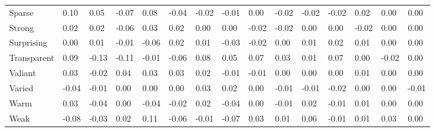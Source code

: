 \documentclass[
]{article}
\newenvironment{lltable}{\begin{landscape}\begin{center}\begin{ThreePartTable}}{\end{ThreePartTable}\end{center}\end{landscape}}
\begin{document}
\begin{lltable}
{\begin{longtable}{lllllllllllllll}
Sparse & 0.10 & 0.05 & -0.07 & 0.08 & -0.04 & -0.02 & -0.01 & 0.00 & -0.02 & -0.02 & -0.02 & 0.02 & 0.00 & 0.00\\
Strong & 0.02 & 0.02 & -0.06 & 0.03 & 0.02 & 0.00 & 0.00 & -0.02 & -0.02 & 0.00 & 0.00 & -0.02 & 0.00 & 0.00\\
Surprising & 0.00 & 0.01 & -0.01 & -0.06 & 0.02 & 0.01 & -0.03 & -0.02 & 0.00 & 0.01 & 0.02 & 0.01 & 0.00 & 0.00\\
Transparent & 0.09 & -0.13 & -0.11 & -0.01 & -0.06 & 0.08 & 0.05 & 0.07 & 0.03 & 0.01 & 0.07 & 0.00 & -0.02 & 0.00\\
Valiant & 0.03 & -0.02 & 0.04 & 0.03 & 0.03 & 0.02 & -0.01 & -0.01 & 0.00 & 0.00 & 0.00 & 0.01 & 0.00 & 0.00\\
Varied & -0.04 & -0.01 & 0.00 & 0.00 & 0.00 & 0.03 & 0.02 & 0.00 & -0.01 & -0.01 & -0.02 & 0.00 & 0.00 & -0.01\\
Warm & 0.03 & -0.04 & 0.00 & -0.04 & -0.02 & 0.02 & -0.04 & 0.00 & -0.01 & 0.02 & -0.01 & 0.01 & 0.00 & 0.00\\
Weak & -0.08 & -0.03 & 0.02 & 0.11 & -0.06 & -0.01 & -0.07 & 0.03 & 0.01 & 0.06 & -0.01 & 0.01 & 0.03 & 0.00\\
\bottomrule
\end{longtable}

}

\end{lltable}
\end{document}
